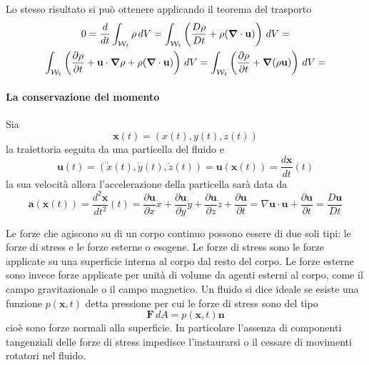 Lo stesso risultato si può ottenere applicando il teorema del trasporto
\begin{multline*}
0 = \frac{d}{dt}\int_{\mathcal{W}_t}\rho\,dV = \int_{\mathcal{W}_t}\left(\frac{D\rho}{D t}+\rho(\boldsymbol{\nabla}\cdot\mathbf{u})\right)\,dV = \\
\int_{\mathcal{W}_t}\left(\frac{\partial\rho}{\partial t}+\mathbf{u}\cdot\boldsymbol{\nabla}\rho+\rho(\boldsymbol{\nabla}\cdot\mathbf{u})\right)\,dV = 
\int_{\mathcal{W}_t}\left(\frac{\partial\rho}{\partial t}+\boldsymbol{\nabla}(\rho\mathbf{u})\right)\,dV = 
\end{multline*}

\paragraph{La conservazione del momento}
Sia
\begin{equation*}
\mathbf{x}(t) = (x(t),y(t),z(t))
\end{equation*}
la traiettoria seguita da una particella del fluido e
\begin{equation*}
\mathbf{u}(t) = (\dot{x}(t),\dot{y}(t),\dot{z}(t)) = \mathbf{u}(\mathbf{x}(t)) = \frac{d\mathbf{x}}{dt}(t)
\end{equation*}
la sua velocità allora l'accelerazione della particella sarà data da
\begin{equation*} 
\mathbf{a}(\mathbf{x}(t)) = \frac{d^2\mathbf{x}}{dt^2} (t) = \frac{\partial  \mathbf{u}}{\partial x}\dot{x} + \frac{\partial  \mathbf{u}}{\partial y}\dot{y} + \frac{\partial  \mathbf{u}}{\partial z}\dot{z} + \frac{\partial \mathbf{u}}{\partial t}
= \nabla  \mathbf{u} \cdot  \mathbf{u} + \frac{\partial \mathbf{u}}{\partial t} = \frac{D \mathbf{u}}{Dt}
\end{equation*}

Le forze che agiscono su di un corpo continuo possono essere di due soli tipi: le forze di stress e le forze esterne o esogene. Le forze di stress sono le forze applicate su una superficie interna al corpo dal resto del corpo. Le forze esterne sono invece forze applicate per unità di volume da agenti esterni al corpo, come il campo gravitazionale o il campo magnetico. Un fluido si dice ideale se esiste una funzione $p(\mathbf{x},t)$ detta pressione per cui le forze di stress sono del tipo
\begin{equation*}
\mathbf{F}\,dA = p(\mathbf{x},t)\mathbf{n}
\end{equation*}
cioè sono forze normali alla superficie. In particolare l'assenza di componenti tangenziali delle forze di stress impedisce l'instaurarsi o il cessare di movimenti rotatori nel fluido.

